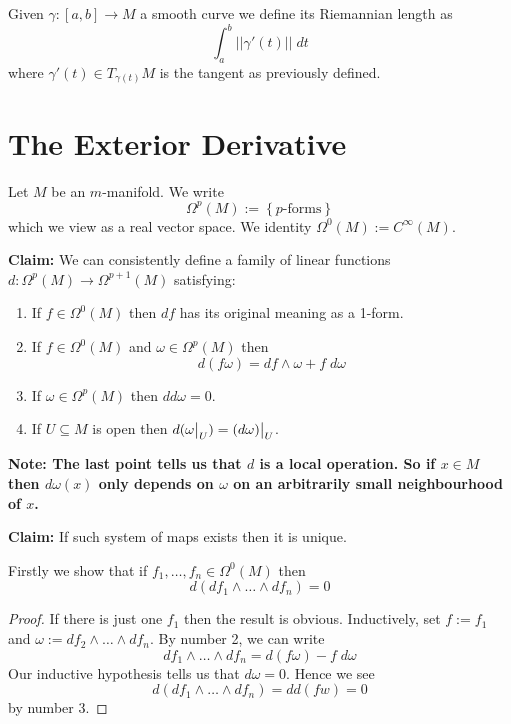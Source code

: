 \documentclass[11pt]{article}
\newcommand{\defeq}{:=}
\newcommand{\norm}[1]{||#1||}
\newcommand\restr[2]{{%
  \left.\kern-\nulldelimiterspace %
  #1 %
  \vphantom{\big|} %
  \right|_{#2} %
  }}
\newenvironment{defin}
	{\begin{mdframed}[backgroundcolor=white, roundcorner=5pt, linewidth=1pt, linecolor=RoyalBlue]
		\setlength{\parindent}{0pt}}
	{\end{mdframed}}
\newcommand{\mdf}[1]{{\color{RoyalBlue} #1}}
\newenvironment{note}
	{\begin{mdframed}[backgroundcolor=white, linecolor=RubineRed, roundcorner=5pt, linewidth=1pt]\bfseries{Note:}\normalfont
	\setlength{\parindent}{0pt}}
	{\end{mdframed}}
\begin{document}
\begin{defin}
	Given $\gamma:[a, b]\to M$ a smooth curve we define its \mdf{Riemannian length} as
	\[
		\int_a^b \norm{\gamma'(t)}\; dt
	\]
	where $\gamma'(t) \in T_{\gamma(t)}M$ is the tangent as previously defined.
\end{defin}

\section{The Exterior Derivative}
Let $M$ be an $m$-manifold.
We write
\[
	\Omega^p(M)\defeq\left\{ p\text{-forms}\right\}
\]
which we view as a real vector space.
We identity $\Omega^0(M)\defeq C^\infty(M)$.

\noindent\textbf{Claim: }We can consistently define a family of linear functions $d:\Omega^p(M)\to \Omega^{p+1}(M)$ satisfying:

\begin{enumerate}
	\item If $f\in\Omega^0(M)$ then $df$ has its original meaning as a 1-form.
	\item If $f\in\Omega^0(M)$ and $\omega\in\Omega^p(M)$ then
		\[
			d(f\omega) = df \wedge \omega + f \; d\omega
		\]
	\item If $\omega\in\Omega^p(M)$ then $dd\omega =0$.
	\item If $U\subseteq M$ is open then $d(\restr{\omega}{U})=\restr{( d\omega )}{U}$.
\end{enumerate}

\begin{note}
The last point tells us that $d$ is a local operation.
So if $x\in M$ then $d\omega(x)$ only depends on $\omega$ on an arbitrarily small neighbourhood of $x$.
\end{note}

\noindent\textbf{Claim: }If such system of maps exists then it is unique.

Firstly we show that if $f_1, \dots , f_n\in\Omega^0(M)$ then
\[
	d(df_1 \wedge \dots \wedge df_n) = 0
\]

\begin{proof}
If there is just one $f_1$ then the result is obvious.
Inductively, set $f\defeq f_1$ and $\omega\defeq df_2 \wedge \dots \wedge df_n$.
By number 2, we can write
\[
	df_1 \wedge \dots \wedge df_n = d(f\omega) - f \; d\omega
\]
Our inductive hypothesis tells us that $d\omega = 0$.
Hence we see
\[
	d(df_1 \wedge \dots \wedge df_n) = dd(fw) = 0
\]
by number 3.
\end{proof}
\end{document}
